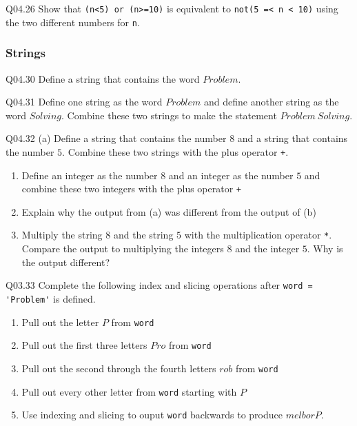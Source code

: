 \documentclass{book}
\newcommand{\passthrough}[1]{#1}
\begin{document}
Q04.26 Show that \passthrough{\lstinline!(n<5) or (n>=10)!} is
equivalent to \passthrough{\lstinline!not(5 =< n < 10)!} using the two
different numbers for \passthrough{\lstinline!n!}.
    




    
        \hypertarget{strings}{%
\subsubsection{Strings}\label{strings}}

Q04.30 Define a string that contains the word \(Problem\).

Q04.31 Define one string as the word \(Problem\) and define another
string as the word \(Solving\). Combine these two strings to make the
statement \(Problem \ Solving\).

Q04.32 (a) Define a string that contains the number \(8\) and a string
that contains the number \(5\). Combine these two strings with the plus
operator \passthrough{\lstinline!+!}.

\begin{enumerate}
\def\labelenumi{(\alph{enumi})}
\setcounter{enumi}{1}
\item
  Define an integer as the number \(8\) and an integer as the number
  \(5\) and combine these two integers with the plus operator
  \passthrough{\lstinline!+!}
\item
  Explain why the output from (a) was different from the output of (b)
\item
  Multiply the string \(8\) and the string \(5\) with the multiplication
  operator \passthrough{\lstinline!*!}. Compare the output to
  multiplying the integers \(8\) and the integer \(5\). Why is the
  output different?
\end{enumerate}

Q03.33 Complete the following index and slicing operations after
\passthrough{\lstinline!word = 'Problem'!} is defined.

\begin{enumerate}
\def\labelenumi{(\alph{enumi})}
\item
  Pull out the letter \(P\) from \passthrough{\lstinline!word!}
\item
  Pull out the first three letters \(Pro\) from
  \passthrough{\lstinline!word!}
\item
  Pull out the second through the fourth letters \(rob\) from
  \passthrough{\lstinline!word!}
\item
  Pull out every other letter from \passthrough{\lstinline!word!}
  starting with \(P\)
\item
  Use indexing and slicing to ouput \passthrough{\lstinline!word!}
  backwards to produce \(melborP\).
\end{enumerate}
\end{document}
